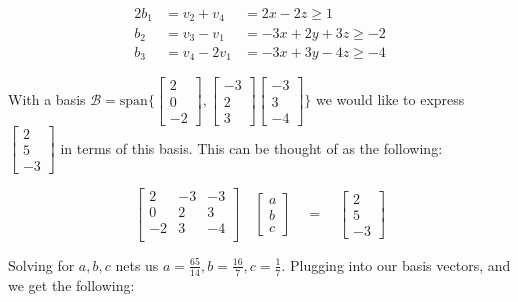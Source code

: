 \documentclass[11pt]{article}
\theoremstyle{definition}
\theoremstyle{case}
\theoremstyle{theorem}
\begin{document}
\begin{enumerate}[label=(\alph*)]
\begin{alignat}{2}
  b_1 &= v_2 + v_4 &= 2x - 2z \geq 1 \\
  b_2 &= v_3 - v_1 &= -3x + 2y +3z \geq -2 \\
  b_3 &= v_4 - 2v_1 &= -3x + 3y -4z \geq -4 
\end{alignat}

With a basis $\mathcal{B} = \text{span} \{ 
  \begin{bmatrix}2\\0\\-2\end{bmatrix},  
  \begin{bmatrix}-3\\2\\3\end{bmatrix}
  \begin{bmatrix}-3\\3\\-4\end{bmatrix}
\}$ we would like to express $\begin{bmatrix}2\\5\\-3\end{bmatrix}$
in terms of this basis. This can be thought of as the following:

\[
  \left[
    \begin{array}{ccc}
      2  & -3 & -3 \\
      0  &  2 &  3 \\
     -2  &  3 & -4 \\
    \end{array}
  \right] \quad
  \begin{bmatrix}
    a \\
    b \\
    c
  \end{bmatrix} \quad
  = 
  \quad
  \begin{bmatrix}
    2 \\
    5 \\
    -3
  \end{bmatrix}
\]

Solving for $a,b,c$ nets us $a = \frac{65}{14}, b = \frac{16}{7}, c = \frac{1}{7}$. 
Plugging into our basis vectors, and we get the following:


\end{enumerate}
\end{document}
